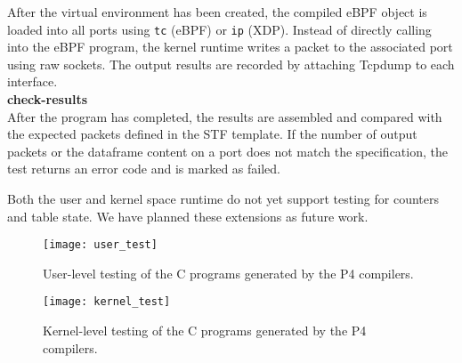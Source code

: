After the virtual environment has been created, the compiled eBPF object is 
loaded into all ports using \texttt{tc} (eBPF) or \texttt{ip} (XDP). Instead of 
directly calling into the eBPF program, the kernel 
runtime writes a packet to the associated port using raw sockets. The output 
results are recorded by attaching Tcpdump to each interface.\\
\textbf{check-results}\\
After the program has completed, the results are assembled and compared with 
the expected packets defined in the STF template. If the number of output 
packets or the dataframe content on a port does not match the specification, 
the test returns an error code and is marked as failed.

Both the user and kernel space runtime do not yet support testing for counters 
and table state. We have planned these extensions as future work.
\begin{figure}
	\centering
	\texttt{[image: user\_test]}
	\caption{User-level testing of the C programs generated by the P4 compilers.}
	\label{fig:user_test}
\end{figure}
\begin{figure}
	\centering
	\texttt{[image: kernel\_test]}
	\caption{Kernel-level testing of the C programs generated by the P4 
	compilers.}
	\label{fig:kernel_test}
\end{figure}
